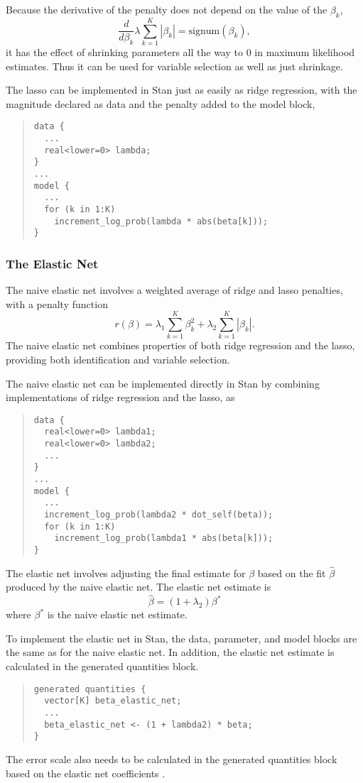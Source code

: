  Because the derivative of the
penalty does not depend on the value of the $\beta_k$,
\[
\frac{d}{d\beta_k} \lambda \sum_{k=1}^K | \beta_k | =
\mbox{signum}(\beta_k),
\]
it has the effect of shrinking parameters all the way to 0 in maximum
likelihood estimates.  Thus it can be used for variable selection as
well as just shrinkage.

The lasso can be implemented in Stan just as easily as ridge
regression, with the magnitude declared as data and the penalty added
to the model block,
%
\begin{quote}
\begin{Verbatim}
data {
  ...
  real<lower=0> lambda;
}
...
model {
  ...
  for (k in 1:K)
    increment_log_prob(lambda * abs(beta[k]));
}
\end{Verbatim}
\end{quote}

\subsubsection{The Elastic Net}

The naive elastic net \citep{ZouHastie:2005} involves a weighted
average of ridge and lasso penalties, with a penalty function
\[
r(\beta) = \lambda_1 \sum_{k=1}^K \beta_k^2 + \lambda_2 \sum_{k=1}^K
|\beta_k|.
\]
The naive elastic net combines properties of both ridge regression and
the lasso, providing both identification and variable selection.

The naive elastic net can be implemented directly in Stan by combining
implementations of ridge regression and the lasso, as
%
\begin{quote}
\begin{Verbatim}
data {
  real<lower=0> lambda1;
  real<lower=0> lambda2;
  ...
}
...
model {
  ...
  increment_log_prob(lambda2 * dot_self(beta));
  for (k in 1:K)
    increment_log_prob(lambda1 * abs(beta[k]));
}
\end{Verbatim}
\end{quote}
%

The elastic net \citep{ZouHastie:2005} involves adjusting the final estimate for
$\beta$ based on the fit $\hat{\beta}$ produced by the naive elastic
net.  The elastic net estimate is
\[
\hat{\beta} = (1 + \lambda_2) \beta^*
\]
where $\beta^{*}$ is the naive elastic net estimate.

To implement the elastic net in Stan, the data, parameter, and model
blocks are the same as for the naive elastic net.  In addition, the
elastic net estimate is calculated in the generated quantities block.
%
\begin{quote}
\begin{Verbatim}
generated quantities {
  vector[K] beta_elastic_net;
  ...
  beta_elastic_net <- (1 + lambda2) * beta;
}
\end{Verbatim}
\end{quote}
%
The error scale also needs to be calculated in the generated
quantities block based on the elastic net coefficients
.


